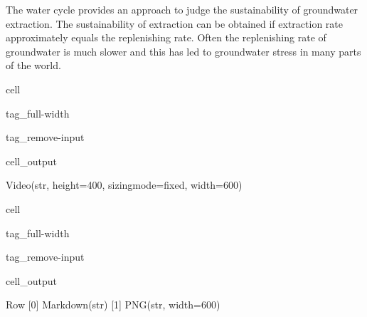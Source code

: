 \documentclass[letterpaper,10pt,english]{jupyterBook}
\begin{document}
\sphinxAtStartPar
The water cycle provides an approach to judge the sustainability of groundwater extraction. The sustainability of extraction can be obtained if extraction rate approximately equals the replenishing rate. Often the replenishing rate of groundwater is much slower and this has led to groundwater stress in many parts of the world.

\begin{sphinxuseclass}{cell}
\begin{sphinxuseclass}{tag_full-width}
\begin{sphinxuseclass}{tag_remove-input}\begin{sphinxVerbatimOutput}

\begin{sphinxuseclass}{cell_output}
\begin{sphinxVerbatim}[commandchars=\\\{\}]
Video(str, height=400, sizing\PYGZus{}mode=\PYGZsq{}fixed\PYGZsq{}, width=600)
\end{sphinxVerbatim}

\end{sphinxuseclass}\end{sphinxVerbatimOutput}

\end{sphinxuseclass}
\end{sphinxuseclass}
\end{sphinxuseclass}
\begin{sphinxuseclass}{cell}
\begin{sphinxuseclass}{tag_full-width}
\begin{sphinxuseclass}{tag_remove-input}\begin{sphinxVerbatimOutput}

\begin{sphinxuseclass}{cell_output}
\begin{sphinxVerbatim}[commandchars=\\\{\}]
Row
    [0] Markdown(str)
    [1] PNG(str, width=600)
\end{sphinxVerbatim}

\end{sphinxuseclass}\end{sphinxVerbatimOutput}

\end{sphinxuseclass}
\end{sphinxuseclass}
\end{sphinxuseclass}
\end{document}
